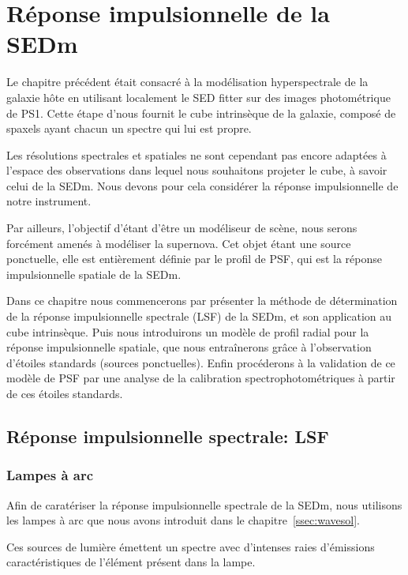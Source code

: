 \documentclass[../main/main.tex]{subfiles}
\begin{document}
\setcounter{chapter}{5}
\chapter{Réponse impulsionnelle de la SEDm}\label{ch:irf}
\minitoc
\vspace{2cm}
Le chapitre précédent était consacré à la modélisation hyperspectrale de
la galaxie hôte en utilisant localement le SED fitter \cigale sur des
images photométrique de PS1. Cette étape d'\hypergal nous fournit le
cube intrinsèque de la galaxie, composé de spaxels ayant chacun un
spectre qui lui est propre.

Les résolutions spectrales et spatiales ne sont cependant pas encore
adaptées à l'espace des observations dans lequel nous souhaitons projeter
le cube, à savoir celui de la SEDm. Nous devons pour cela considérer la
réponse impulsionnelle de notre instrument.

Par ailleurs, l'objectif d'\hypergal étant d'être un modéliseur de
scène, nous serons forcément amenés à modéliser la supernova. Cet objet
étant une source ponctuelle, elle est entièrement définie par le profil
de PSF, qui est la réponse impulsionnelle spatiale de la SEDm.

Dans ce chapitre nous commencerons par présenter la méthode de
détermination de la réponse impulsionnelle spectrale (LSF) de la SEDm,
et son application au cube intrinsèque. Puis nous introduirons un modèle
de profil radial pour la réponse impulsionnelle spatiale, que nous
entraînerons grâce à l'observation d'étoiles standards (sources
ponctuelles). Enfin procéderons à la validation de ce modèle de PSF par
une analyse de la calibration spectrophotométriques à partir de ces
étoiles standards. 
\newpage

\section{Réponse impulsionnelle spectrale: LSF}

\subsection{Lampes à arc}

Afin de caratériser la réponse impulsionnelle spectrale de la SEDm, nous
utilisons les lampes à arc que nous avons introduit dans le
chapitre~\ref{ssec:wavesol}.

Ces sources de lumière émettent un spectre avec d'intenses raies
d'émissions caractéristiques de l'élément présent dans la lampe.
\end{document}
